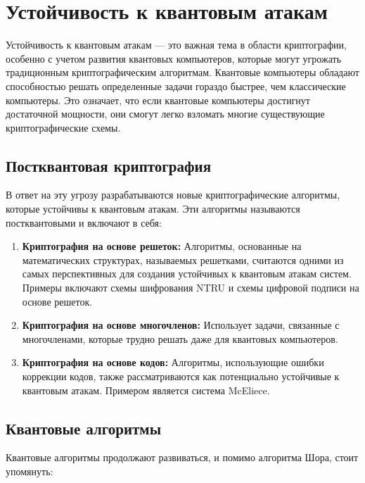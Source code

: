 \documentclass[12pt]{article}
\begin{document}
\newpage

\section{Устойчивость к квантовым атакам}

Устойчивость к квантовым атакам — это важная тема в области криптографии, особенно с учетом развития квантовых компьютеров, которые могут угрожать традиционным криптографическим алгоритмам. Квантовые компьютеры обладают способностью решать определенные задачи гораздо быстрее, чем классические компьютеры. Это означает, что если квантовые компьютеры достигнут достаточной мощности, они смогут легко взломать многие существующие криптографические схемы.

\subsection{Постквантовая криптография}
В ответ на эту угрозу разрабатываются новые криптографические алгоритмы, которые устойчивы к квантовым атакам. Эти алгоритмы называются постквантовыми и включают в себя:

\begin{enumerate}[label=\arabic*.]
    \item \textbf{Криптография на основе решеток:} Алгоритмы, основанные на математических структурах, называемых решетками, считаются одними из самых перспективных для создания устойчивых к квантовым атакам систем. Примеры включают схемы шифрования NTRU и схемы цифровой подписи на основе решеток.
    
    \item \textbf{Криптография на основе многочленов:} Использует задачи, связанные с многочленами, которые трудно решать даже для квантовых компьютеров. 
    
    \item \textbf{Криптография на основе кодов:} Алгоритмы, использующие ошибки коррекции кодов, также рассматриваются как потенциально устойчивые к квантовым атакам. Примером является система McEliece.
\end{enumerate}

\subsection{Квантовые алгоритмы}
Квантовые алгоритмы продолжают развиваться, и помимо алгоритма Шора, стоит упомянуть:
\end{document}
